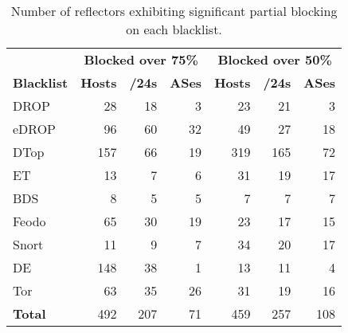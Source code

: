 \begin{table}[t]
\centering
\caption{Number of reflectors exhibiting significant partial blocking on each blacklist.}
\begin{tabular}{l r r r | r r r }
 \toprule
 \textbf{}           &\multicolumn{3}{c}{\textbf{Blocked over 75\%}}    &\multicolumn{3}{c}{\textbf{Blocked over 50\%}} \\
 \textbf{Blacklist}  &\textbf{Hosts}   &\textbf{/24s}   &\textbf{ASes}  &\textbf{Hosts}   &\textbf{/24s}   &\textbf{ASes} \\
 \midrule
 DROP      & 28      & 18     & 3   &  23      & 21    & 3\\
 eDROP     & 96      & 60     & 32  &  49      & 27    & 18\\
 DTop        & 157     & 66     & 19  &  319     & 165   & 72\\
 ET     & 13      & 7      & 6   &  31      & 19    & 17\\
 BDS           & 8       & 5      & 5   &  7       & 7     & 7\\
 Feodo             & 65      & 30     & 19  &  23      & 17    & 15\\
 Snort       & 11      & 9      & 7   &  34      & 20    & 17\\
 DE       & 148     & 38     & 1   &  13      & 11    & 4\\
 Tor             & 63      & 35     & 26  &  31      & 19    & 16\\
 \midrule
 \textbf{Total}              & 492     & 207    & 71  & 459      & 257   & 108\\
 \bottomrule
\end{tabular}

\label{tab:partial-blocking-reflectors}
\end{table}

